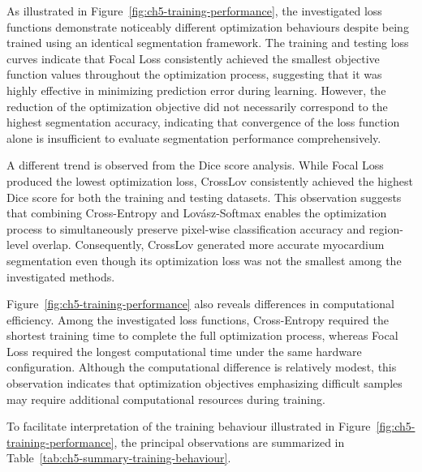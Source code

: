 As illustrated in Figure~\ref{fig:ch5-training-performance}, the investigated loss functions demonstrate noticeably different optimization behaviours despite being trained using an identical segmentation framework. The training and testing loss curves indicate that Focal Loss consistently achieved the smallest objective function values throughout the optimization process, suggesting that it was highly effective in minimizing prediction error during learning. However, the reduction of the optimization objective did not necessarily correspond to the highest segmentation accuracy, indicating that convergence of the loss function alone is insufficient to evaluate segmentation performance comprehensively.

A different trend is observed from the Dice score analysis. While Focal Loss produced the lowest optimization loss, CrossLov consistently achieved the highest Dice score for both the training and testing datasets. This observation suggests that combining Cross-Entropy and Lovász-Softmax enables the optimization process to simultaneously preserve pixel-wise classification accuracy and region-level overlap. Consequently, CrossLov generated more accurate myocardium segmentation even though its optimization loss was not the smallest among the investigated methods.

Figure~\ref{fig:ch5-training-performance} also reveals differences in computational efficiency. Among the investigated loss functions, Cross-Entropy required the shortest training time to complete the full optimization process, whereas Focal Loss required the longest computational time under the same hardware configuration. Although the computational difference is relatively modest, this observation indicates that optimization objectives emphasizing difficult samples may require additional computational resources during training.

To facilitate interpretation of the training behaviour illustrated in Figure~\ref{fig:ch5-training-performance}, the principal observations are summarized in  Table~\ref{tab:ch5-summary-training-behaviour}.

